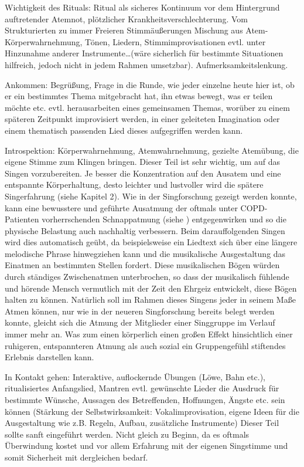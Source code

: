 Wichtigkeit des Rituals: Ritual als sicheres Kontinuum vor dem Hintergrund auftretender Atemnot, plötzlicher Krankheitsverschlechterung. 
Vom Strukturierten zu immer Freieren Stimmäußerungen
Mischung aus Atem- Körperwahrnehmung, Tönen, Liedern, Stimmimprovisationen evtl. unter Hinzunahme anderer Instrumente…(wäre sicherlich für bestimmte Situationen hilfreich, jedoch nicht in jedem Rahmen umsetzbar). 
Aufmerksamkeitslenkung. 

Ankommen: 
Begrüßung, Frage in die Runde, wie jeder einzelne heute hier ist, ob er ein bestimmtes Thema mitgebracht hat, ihn etwas bewegt, was er teilen möchte etc. evtl. herausarbeiten eines gemeinsamen Themas, worüber zu einem späteren Zeitpunkt improvisiert werden, in einer geleiteten Imagination oder einem thematisch passenden Lied dieses aufgegriffen werden kann.

Introspektion: 
Körperwahrnehmung, Atemwahrnehmung, gezielte Atemübung, die eigene Stimme zum Klingen bringen. Dieser Teil ist sehr wichtig, um auf das Singen vorzubereiten. Je besser die Konzentration auf den Ausatem und eine entspannte Körperhaltung, desto leichter und lustvoller wird die spätere Singerfahrung (siehe Kapitel 2). Wie in der Singforschung gezeigt werden konnte, kann eine bewusstere und geführte Ausatmung der oftmals unter COPD-Patienten vorherrschenden Schnappatmung (siehe \label{copd}) entgegenwirken und so die physische Belastung auch nachhaltig verbessern. Beim darauffolgenden Singen wird dies automatisch geübt, da beispielsweise ein Liedtext sich über eine längere melodische Phrase hinwegziehen kann und die musikalische Ausgestaltung das Einatmen an bestimmten Stellen fordert. Diese musikalischen Bögen würden durch ständiges Zwischenatmen unterbrochen, so dass der musikalisch fühlende und hörende Mensch vermutlich mit der Zeit den Ehrgeiz entwickelt, diese Bögen halten zu können. Natürlich soll im Rahmen dieses Singens jeder in seinem Maße Atmen können, nur wie in der neueren Singforschung bereits belegt werden konnte, gleicht sich die Atmung der Mitglieder einer Singgruppe im Verlauf immer mehr an. Was zum einen körperlich einen großen Effekt hinsichtlich einer ruhigeren, entspannteren Atmung als auch sozial ein Gruppengefühl stiftendes Erlebnis darstellen kann.

In Kontakt gehen: 
Interaktive, auflockernde Übungen (Löwe, Bahn etc.), ritualisiertes Anfangslied, Mantren evtl. gewünschte Lieder die Ausdruck für bestimmte Wünsche, Aussagen des Betreffenden, Hoffnungen, Ängste etc. sein können
(Stärkung der Selbstwirksamkeit: Vokalimprovisation, eigene Ideen für die Ausgestaltung wie z.B. Regeln, Aufbau, zusätzliche Instrumente) Dieser Teil sollte sanft eingeführt werden. Nicht gleich zu Beginn, da es oftmals Überwindung kostet und vor allem Erfahrung mit der eigenen Singstimme und somit Sicherheit mit dergleichen bedarf.

